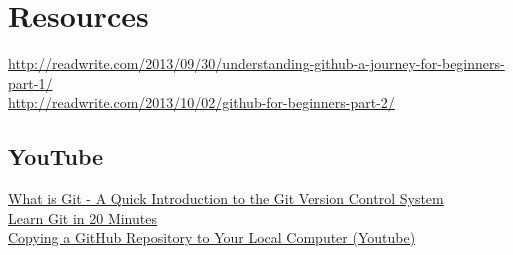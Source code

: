 \documentclass[11pt,a4paper]{article}
\begin{document}
\section*{Resources}

\noindent
\href{http://readwrite.com/2013/09/30/understanding-github-a-journey-for-beginners-part-1/}{http://readwrite.com/2013/09/30/understanding-github-a-journey-for-beginners-part-1/}\\

\noindent
\href{http://readwrite.com/2013/10/02/github-for-beginners-part-2/}{http://readwrite.com/2013/10/02/github-for-beginners-part-2/}\\


    \subsection*{YouTube}
    \noindent
    \href{https://www.youtube.com/watch?v=OqmSzXDrJBk}{What is Git - A Quick Introduction to the Git Version Control System}\\
    
    \noindent
    \href{https://www.youtube.com/watch?v=Y9XZQO1n_7c}{Learn Git in 20 Minutes}\\
    
    \noindent
    \href{https://www.youtube.com/watch?v=O72FWNeO-xY}{Copying a GitHub Repository to Your Local Computer (Youtube)}\\
    
\end{document}
